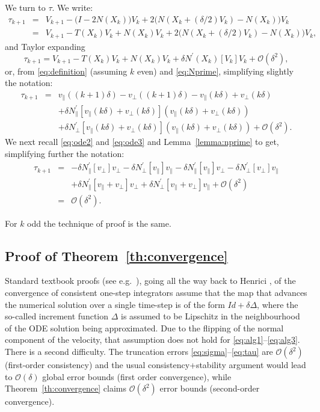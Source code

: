 \documentclass[10pt]{article}
\newcommand{\Npperp}{N^\prime_\perp}
\newcommand{\Nppar}{N^\prime_\|}
\newcommand{\vperp}{v_\perp}
\newcommand{\vpar}{v_\|}
\begin{document}
We turn to $\tau$. We write:
\begin{eqnarray*}
\tau_{k+1}  & =&V_{k+1}- \big(I-2N(X_k)\big)V_k
 + 2\big(N(X_k+(\delta/2)V_k)-N(X_k)\big)V_k\\
&=&V_{k+1}-T(X_k)V_k+N(X_k)V_k
 + 2\big(N(X_k+(\delta/2)V_k)-N(X_k)\big)V_k,
\end{eqnarray*}
and Taylor expanding
\[
\tau_{k+1} = V_{k+1} -T(X_k)V_k+N(X_k)V_k
 +\delta N^\prime(X_k)[V_k]V_k+\mathcal{O}(\delta^2),
\]
or, from \eqref{eq:definition} (assuming \(k\) even) and \eqref{eq:Nprime}, simplifying slightly the notation:
\begin{eqnarray*}
\tau_{k+1}& = &\vpar((k+1)\delta)-\vperp((k+1)\delta)-\vpar(k\delta)+\vperp(k\delta)\\
&&+\delta \Nppar[\vpar(k\delta)+\vperp(k\delta)](\vpar(k\delta)+\vperp(k\delta))\\&& +\delta \Npperp[\vpar(k\delta)+\vperp(k\delta)]
(\vpar(k\delta)+\vperp(k\delta)) +\mathcal{O}(\delta^2).
\end{eqnarray*}
We next recall \eqref{eq:ode2} and \eqref{eq:ode3} and  Lemma~\ref{lemma:nprime} to get, simplifying further the notation:
\begin{eqnarray*}
\tau_{k+1}& = &-\delta\Nppar[\vperp]\vperp -\delta\Npperp[\vpar]\vpar-\delta \Nppar[\vpar]\vperp-\delta\Npperp[\vperp]\vpar\\&&
+\delta \Nppar[\vpar+\vperp]\vperp +\delta \Npperp[\vpar+\vperp]
\vpar +\mathcal{O}(\delta^2)\\&=& \mathcal{O}(\delta^2).
\end{eqnarray*}

For \(k\) odd the technique of proof is the same.

\subsection{Proof of Theorem~\ref{th:convergence}}

Standard textbook proofs (see e.g.\ \cite[Chapter 2.3]{HNW93}), going all the way back to Henrici \cite{H}, of the convergence of consistent one-step integrators assume that the
map that advances the numerical solution over a single time-step is  of the form \(Id+\delta \Delta\), where the so-called increment function \(\Delta\) is assumed to be Lipschitz in the neighbourhood of the ODE solution being approximated.
Due to the flipping of the normal component of the velocity, that assumption does not hold for \eqref{eq:alg1}--\eqref{eq:alg3}.
 There is a second difficulty. The  truncation errors \eqref{eq:sigma}--\eqref{eq:tau} are \(\mathcal{O}(\delta^2)\) (first-order consistency) and the usual consistency+stability argument would lead to \(\mathcal{O}(\delta)\) global error bounds (first order convergence), while Theorem~\ref{th:convergence} claims \(\mathcal{O}(\delta^2)\) error bounds (second-order convergence).
\end{document}
